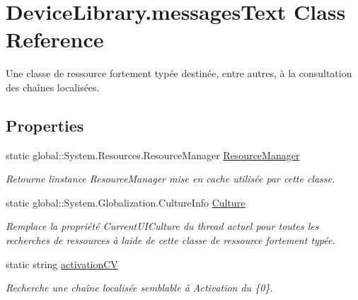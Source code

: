 \hypertarget{class_device_library_1_1messages_text}{}\section{Device\+Library.\+messages\+Text Class Reference}
\label{class_device_library_1_1messages_text}


Une classe de ressource fortement typée destinée, entre autres, à la consultation des chaînes localisées.  


\subsection*{Properties}
\begin{DoxyCompactItemize}
\item 
static global\+::\+System.\+Resources.\+Resource\+Manager \mbox{\hyperlink{class_device_library_1_1messages_text_a031636cf4621ff551aa62648e5c08b4b}{Resource\+Manager}}
\begin{DoxyCompactList}\small\item\em Retourne l\textquotesingle{}instance Resource\+Manager mise en cache utilisée par cette classe. \end{DoxyCompactList}\item 
static global\+::\+System.\+Globalization.\+Culture\+Info \mbox{\hyperlink{class_device_library_1_1messages_text_abcb12fd4a215b678e9b5abda167ce8f6}{Culture}}
\begin{DoxyCompactList}\small\item\em Remplace la propriété Current\+U\+I\+Culture du thread actuel pour toutes les recherches de ressources à l\textquotesingle{}aide de cette classe de ressource fortement typée. \end{DoxyCompactList}\item 
static string \mbox{\hyperlink{class_device_library_1_1messages_text_a1b8c8f4de98cd13953372dac6cf288da}{activation\+CV}}
\begin{DoxyCompactList}\small\item\em Recherche une chaîne localisée semblable à Activation du \{0\}. \end{DoxyCompactList}\item 

\end{DoxyCompactItemize}
